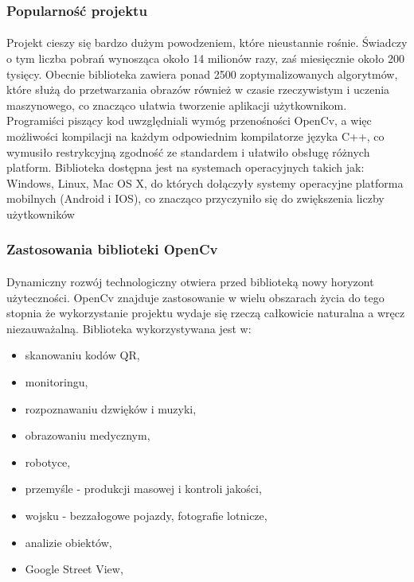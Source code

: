 \documentclass[a4paper,12pt]{article}
\begin{document}
		\subsubsection{Popularność projektu}  
			\paragraph{\noindent}
				Projekt cieszy się bardzo dużym powodzeniem, które nieustannie rośnie. Świadczy o tym liczba pobrań 
				wynosząca około 14 milionów razy, zaś miesięcznie około 200 tysięcy.
				Obecnie biblioteka zawiera ponad 2500 zoptymalizowanych algorytmów, które służą do przetwarzania obrazów
				również w czasie rzeczywistym i uczenia maszynowego, co znacząco ułatwia tworzenie aplikacji użytkownikom. 
				Programiści piszący kod uwzględniali wymóg przenośności OpenCv, a więc możliwości kompilacji na każdym odpowiednim kompilatorze języka C++, co wymusiło restrykcyjną zgodność ze standardem i ułatwiło obsługę różnych platform.
				Biblioteka dostępna jest na systemach operacyjnych takich jak: Windows, Linux, Mac OS X, do których dołączyły systemy operacyjne platforma mobilnych (Android i IOS), co znacząco przyczyniło się do zwiększenia liczby użytkowników

		\subsubsection{Zastosowania biblioteki OpenCv}
			\paragraph{\noindent} 
			    Dynamiczny rozwój technologiczny otwiera przed biblioteką nowy horyzont użyteczności. OpenCv znajduje zastosowanie w wielu obszarach życia do tego stopnia że wykorzystanie projektu wydaje się rzeczą całkowicie naturalna a wręcz niezauważalną. Biblioteka wykorzystywana jest w:
			
			    \begin{spacing}{1}
			        \begin{itemize}
        				\item skanowaniu kodów QR,
        				\item monitoringu,
        				\item rozpoznawaniu dzwięków i muzyki,
        				\item obrazowaniu medycznym,
        				\item robotyce,	
        				\item przemyśle - produkcji masowej i kontroli jakości,
        				\item wojsku - bezzałogowe pojazdy, fotografie lotnicze,
				        \item analizie obiektów,
				        \item Google Street View,
		            \end{itemize}
                \end{spacing}
    
\end{document}
